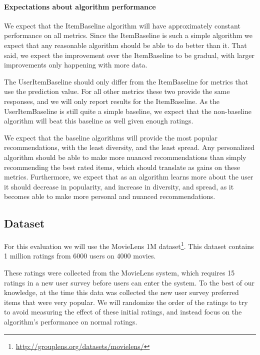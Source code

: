 \documentclass[letterpaper]{sig-alternate}
\begin{document}
  \vspace{-0.5em}
  \paragraph{Expectations about algorithm performance}
  We expect that the ItemBaseline algorithm will have approximately constant performance on all metrics.
  Since the ItemBaseline is such a simple algorithm we expect that any reasonable algorithm should be able to do better than it.
  That said, we expect the improvement over the ItemBaseline to be gradual, with larger improvements only happening with more data.

  The UserItemBaseline should only differ from the ItemBaseline for metrics that use the prediction value.
  For all other metrics these two provide the same responses, and we will only report results for the ItemBaseline.
  As the UserItemBaseline is still quite a simple baseline, we expect that the non-baseline algorithm will beat this baseline as well given enough ratings.
  
  We expect that the baseline algorithms will provide the most popular recommendations, with the least diversity, and the least spread.
  Any personalized algorithm should be able to make more nuanced recommendations than simply recommending the best rated items, which should translate as gains on these metrics.
  Furthermore, we expect that as an algorithm learns more about the user it should decrease in popularity, and increase in diversity, and spread, as it becomes able to make more personal and nuanced recommendations.


  \subsection*{Dataset}

  For this evaluation we will use the MovieLens 1M dataset\footnote{\url{http://grouplens.org/datasets/movielens/}}.
  This dataset contains 1 million ratings from 6000 users on 4000 movies.
  
  These ratings were collected from the MovieLens system, which requires 15 ratings in a new user survey before users can enter the system.
  To the best of our knowledge, at the time this data was collected the new user survey preferred items that were very popular.
  We will randomize the order of the ratings to try to avoid measuring the effect of these initial ratings, and instead focus on the algorithm's performance on normal ratings.
  
\end{document}
